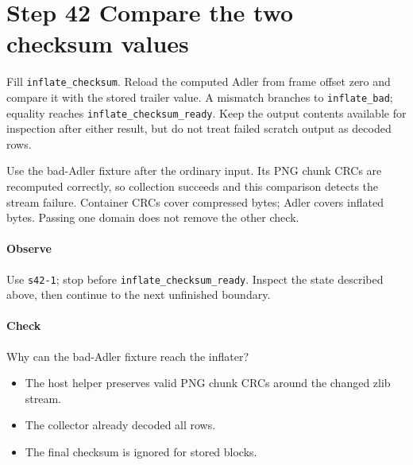 \section{Step 42 Compare the two checksum values}\label{png-inflate-s42}
Fill \texttt{inflate\_checksum}. Reload the computed Adler from frame offset zero and compare it with the stored trailer value. A mismatch branches to \texttt{inflate\_bad}; equality reaches \texttt{inflate\_checksum\_ready}. Keep the output contents available for inspection after either result, but do not treat failed scratch output as decoded rows.

Use the bad-Adler fixture after the ordinary input. Its PNG chunk CRCs are recomputed correctly, so collection succeeds and this comparison detects the stream failure. Container CRCs cover compressed bytes; Adler covers inflated bytes. Passing one domain does not remove the other check.

\paragraph{Observe} Use \texttt{s42-1}; stop before \texttt{inflate\_checksum\_ready}. Inspect the state described above, then continue to the next unfinished boundary.

\paragraph{Check} Why can the bad-Adler fixture reach the inflater?
\begin{itemize}
  \item[A.] The host helper preserves valid PNG chunk CRCs around the changed zlib stream.
  \item[B.] The collector already decoded all rows.
  \item[C.] The final checksum is ignored for stored blocks.
\end{itemize}
